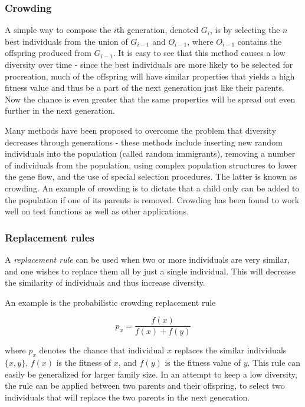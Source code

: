 \subsubsection{Crowding}
\label{sec:crowding} 
A simple way to compose the $i$th generation, denoted $G_i$, is by selecting the $n$ best individuals from the union of $G_{i-1}$ and $O_{i-1}$, where $O_{i-1}$ contains the offspring produced from $G_{i-1}$. %
It is easy to see that this method causes a low diversity over time - since the best individuals are more likely to be selected for procreation, much of the offspring will have similar properties that yields a high fitness value and thus be a part of the next generation just like their parents. Now the chance is even greater that the same properties will be spread out even further in the next generation.

Many methods have been proposed to overcome the problem that diversity decreases through generations - these methods include inserting new random individuals into the population (called random immigrants), removing a number of individuals from the population, using complex population structures to lower the gene flow, and the use of special selection procedures\cite{ursem2002diversity}. The latter is known as crowding. 
An example of crowding is to dictate that a child only can be added to the population if one of its parents is removed.
Crowding has been found to work well on test functions as well as other applications\cite{crowding}. 

\subsubsection{Replacement rules}
A \emph{replacement rule} can be used when two or more individuals are very similar, and one wishes to replace them all by just a single individual. This will decrease the similarity of individuals and thus increase diversity.

An example is the probabilistic crowding replacement rule\cite{Mengshoel_and_Goldberg:1999}

\[p_x = \frac{f(x)}{f(x)+f(y)}\]

where $p_x$ denotes the chance that individual $x$ replaces the similar individuals $\{x, y\}$, $f(x)$ is the fitness of $x$, and $f(y)$ is the fitness value of $y$. This rule can easily be generalized for larger family size. 
In an attempt to keep a low diversity, the rule can be applied between two parents and their offspring, to select two individuals that will replace the two parents in the next generation.













